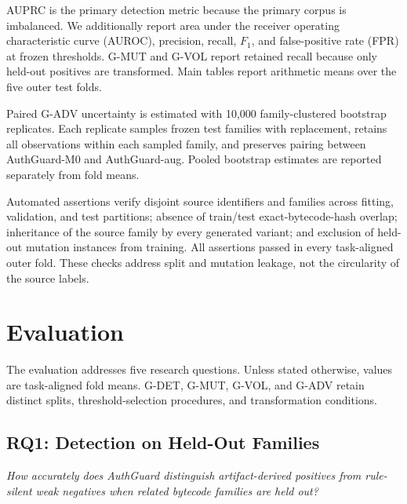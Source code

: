 \documentclass[conference]{IEEEtran}
\begin{document}
AUPRC is the primary detection metric because the primary corpus is imbalanced. We additionally report area under the receiver operating characteristic curve (AUROC), precision, recall, $F_1$, and false-positive rate (FPR) at frozen thresholds. G-MUT and G-VOL report retained recall because only held-out positives are transformed. Main tables report arithmetic means over the five outer test folds.

Paired G-ADV uncertainty is estimated with 10,000 family-clustered bootstrap replicates. Each replicate samples frozen test families with replacement, retains all observations within each sampled family, and preserves pairing between AuthGuard-M0 and AuthGuard-aug. Pooled bootstrap estimates are reported separately from fold means.

Automated assertions verify disjoint source identifiers and families across fitting, validation, and test partitions; absence of train/test exact-bytecode-hash overlap; inheritance of the source family by every generated variant; and exclusion of held-out mutation instances from training. All assertions passed in every task-aligned outer fold. These checks address split and mutation leakage, not the circularity of the source labels.

\section{Evaluation}
\label{sec:evaluation}

The evaluation addresses five research questions. Unless stated otherwise, values are task-aligned fold means. G-DET, G-MUT, G-VOL, and G-ADV retain distinct splits, threshold-selection procedures, and transformation conditions.

\subsection{RQ1: Detection on Held-Out Families}

\emph{How accurately does AuthGuard distinguish artifact-derived positives from rule-silent weak negatives when related bytecode families are held out?}
\end{document}
